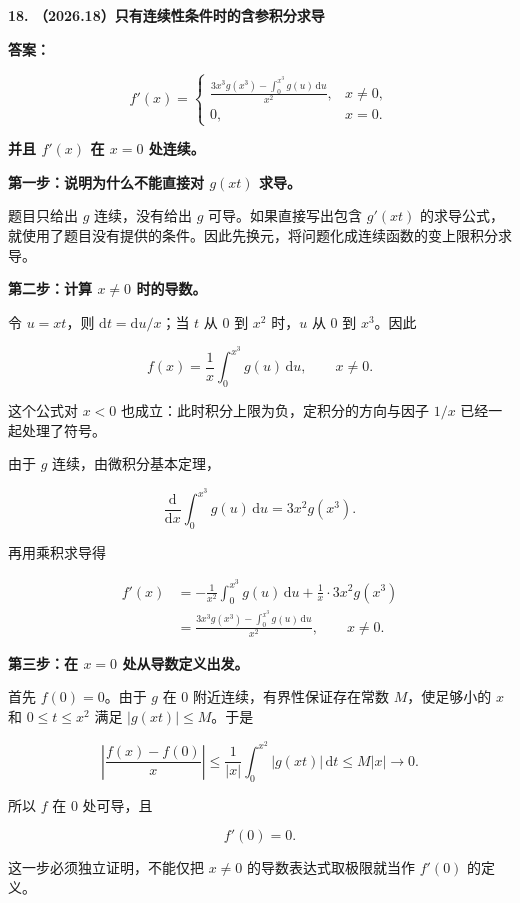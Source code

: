 \documentclass[UTF8,11pt,fontset=windows]{ctexart}
\begin{document}
\clearpage

\textbf{18. （2026.18）只有连续性条件时的含参积分求导}

\textbf{答案：}

$$
f'(x)=\begin{cases}
\displaystyle\frac{3x^3g(x^3)-\int_0^{x^3}g(u)\,\mathrm{d}u}{x^2},&x\ne0,\\[8pt]
0,&x=0.
\end{cases}
$$

\textbf{并且 $f'(x)$ 在 $x=0$ 处连续。}

\textbf{第一步：说明为什么不能直接对 $g(xt)$ 求导。}

题目只给出 $g$ 连续，没有给出 $g$ 可导。如果直接写出包含 $g'(xt)$ 的求导公式，就使用了题目没有提供的条件。因此先换元，将问题化成连续函数的变上限积分求导。

\textbf{第二步：计算 $x\ne0$ 时的导数。}

令 $u=xt$，则 $\mathrm{d}t=\mathrm{d}u/x$；当 $t$ 从 $0$ 到 $x^2$ 时，$u$ 从 $0$ 到 $x^3$。因此

$$
f(x)=\frac1x\int_0^{x^3}g(u)\,\mathrm{d}u,\qquad x\ne0.
$$

这个公式对 $x<0$ 也成立：此时积分上限为负，定积分的方向与因子 $1/x$ 已经一起处理了符号。

由于 $g$ 连续，由微积分基本定理，

$$
\frac{\mathrm{d}}{\mathrm{d}x}\int_0^{x^3}g(u)\,\mathrm{d}u
=3x^2g(x^3).
$$

再用乘积求导得

$$
\begin{aligned}
f'(x)
&=-\frac1{x^2}\int_0^{x^3}g(u)\,\mathrm{d}u
+\frac1x\cdot3x^2g(x^3)\\
&=\frac{3x^3g(x^3)-\int_0^{x^3}g(u)\,\mathrm{d}u}{x^2},\qquad x\ne0.
\end{aligned}
$$

\textbf{第三步：在 $x=0$ 处从导数定义出发。}

首先 $f(0)=0$。由于 $g$ 在 $0$ 附近连续，有界性保证存在常数 $M$，使足够小的 $x$ 和 $0\le t\le x^2$ 满足 $|g(xt)|\le M$。于是

$$
\left|\frac{f(x)-f(0)}x\right|
\le\frac1{|x|}\int_0^{x^2}|g(xt)|\,\mathrm{d}t
\le M|x|\longrightarrow0.
$$

所以 $f$ 在 $0$ 处可导，且

$$
f'(0)=0.
$$

这一步必须独立证明，不能仅把 $x\ne0$ 的导数表达式取极限就当作 $f'(0)$ 的定义。
\end{document}
